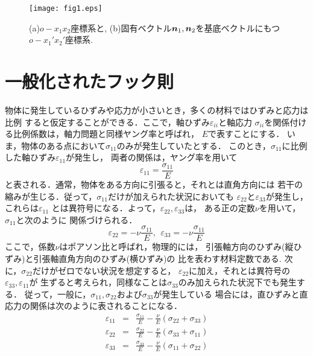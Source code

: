 \documentclass[10pt,a4j]{jarticle}
\begin{document}
\begin{figure}[h]
	\begin{center}
	\texttt{[image: fig1.eps]} 
	\end{center}
	\caption{(a)$o-x_1x_2$座標系と, (b)固有ベクトル$\mbox{\boldmath $n$}_1,\mbox{\boldmath $n$}_2$を基底ベクトルにもつ$o-x_1'x_2'$座標系.} 
	\label{fig:fig6_1}
\end{figure}
\section{一般化されたフック則}
物体に発生しているひずみや応力が小さいとき，多くの材料ではひずみと応力は比例
すると仮定することができる．ここで，軸ひずみ$\varepsilon_{ii}$と軸応力
$\sigma_{ii}$を関係付ける比例係数は，軸力問題と同様ヤング率と呼ばれ，
$E$で表すことにする．
いま，物体のある点において$\sigma_{11}$のみが発生していたとする．
このとき，$\sigma_{11}$に比例した軸ひずみ$\varepsilon_{11}$が発生し，
両者の関係は，ヤング率を用いて
\begin{equation}
	\varepsilon_{11}=\frac{\sigma_{11}}{E}
\end{equation}
と表される．通常，物体をある方向に引張ると，それとは直角方向には
若干の縮みが生じる．従って，$\sigma_{11}$だけが加えられた状況においても
$\varepsilon_{22}$と$\varepsilon_{33}$が発生し，これらは$\varepsilon_{11}$
とは異符号になる．よって，$\varepsilon_{22},\varepsilon_{33}$は，
ある正の定数$\nu$を用いて，$\sigma_{11}$と次のように
関係づけられる．
\begin{equation}
	\varepsilon_{22}=-\nu \frac{\sigma_{11}}{E}, \ \
	\varepsilon_{33}=-\nu \frac{\sigma_{11}}{E}
\end{equation}
ここで，係数$\nu$はポアソン比と呼ばれ，物理的には，
引張軸方向のひずみ(縦ひずみ)と引張軸直角方向のひずみ(横ひずみ)の
比を表わす材料定数である. 次に，$\sigma_{22}$だけがゼロでない状況を想定すると，
$\varepsilon_{22}$に加え，それとは異符号の$\varepsilon_{33}, \varepsilon_{11}$が
生ずると考えられ，同様なことは$\sigma_{33}$のみ加えられた状況下でも発生する．
従って，一般に，$\sigma_{11},\sigma_{22}$および$\sigma_{33}$が発生している
場合には，直ひずみと直応力の関係は次のように表されることになる．
\begin{eqnarray}
	\varepsilon_{11} &=& \frac{\sigma_{11}}{E}-\frac{\nu}{E}\left( \sigma_{22}+\sigma_{33} \right) \\
	\varepsilon_{22} &=& \frac{\sigma_{22}}{E}-\frac{\nu}{E}\left( \sigma_{33}+\sigma_{11} \right) \\
	\varepsilon_{33} &=& \frac{\sigma_{33}}{E}-\frac{\nu}{E}\left( \sigma_{11}+\sigma_{22} \right)
	\label{eqn:eii_sjj}
\end{eqnarray}
\end{document}

